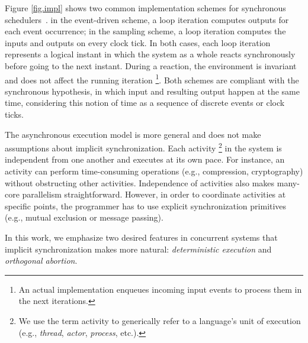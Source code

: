 \documentclass{acm_proc_article-sp}
\newcommand{\1}{\;}
\newcommand{\2}{\;\;}
\newcommand{\3}{\;\;\;}
\newcommand{\5}{\;\;\;\;\;}
\begin{document}
Figure \ref{fig.impl} shows two common implementation schemes for synchronous 
schedulers~\cite{rp.twelve}.
%
in the event-driven scheme, a loop iteration computes outputs for each event 
occurrence;
%
in the sampling scheme, a loop iteration computes the inputs and outputs on 
every clock tick.
%
In both cases, each loop iteration represents a logical instant in which the 
system as a whole reacts synchronously before going to the next instant.
%
During a reaction, the environment is invariant and does not affect the running 
iteration%
\footnote{
An actual implementation enqueues incoming input events to process them in the 
next iterations.
}.
%
Both schemes are compliant with the synchronous hypothesis, in which input and 
resulting output happen at the same time, considering this notion of time as a 
sequence of discrete events or clock ticks.

The asynchronous execution model is more general and does not make assumptions 
about implicit synchronization.
Each activity%
\footnote{We use the term activity to generically refer to a language's unit of 
execution (e.g., \emph{thread}, \emph{actor}, \emph{process}, etc.).}
in the system is independent from one another and executes at its own pace.
%
For instance, an activity can perform time-consuming operations (e.g., 
compression, cryptography) without obstructing other activities.
%
Independence of activities also makes many-core parallelism straightforward.
%
However, in order to coordinate activities at specific points, the programmer 
has to use explicit synchronization primitives (e.g., mutual exclusion or 
message passing).


In this work, we emphasize two desired features in concurrent systems that 
implicit synchronization makes more natural: \emph{deterministic execution} and 
\emph{orthogonal abortion}.
\end{document}
